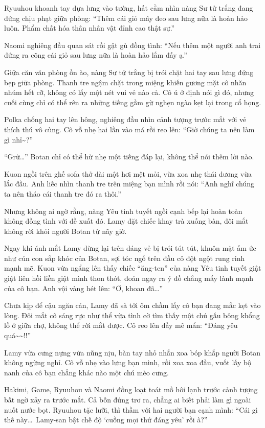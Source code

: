 \documentclass[../main.tex]{subfiles}
\begin{document}
Ryuuhou khoanh tay dựa lưng vào tường, hất cằm nhìn nàng Sư tử trắng đang đứng chịu phạt giữa phòng: ``Thêm cái giỏ mây đeo sau lưng nữa là hoàn hảo luôn. Phẩm chất hóa thân nhân vật đỉnh cao thật sự.''

Naomi nghiêng đầu quan sát rồi gật gù đồng tình: ``Nếu thêm một người anh trai đứng ra cõng cái giỏ sau lưng nữa là hoàn hảo lắm đấy ạ.''

Giữa căn văn phòng ồn ào, nàng Sư tử trắng bị trói chặt hai tay sau lưng đứng bẹp giữa phòng. Thanh tre ngậm chặt trong miệng khiến gương mặt cô nhăn nhúm hết cỡ, không có lấy một nét vui vẻ nào cả. Cô ú ớ định nói gì đó, nhưng cuối cùng chỉ có thể rên ra những tiếng gầm gừ nghẹn ngào kẹt lại trong cổ họng.

Polka chống hai tay lên hông, nghiêng đầu nhìn cảnh tượng trước mắt với vẻ thích thú vô cùng. Cô vỗ nhẹ hai lần vào má rồi reo lên: ``Giờ chúng ta nên làm gì nhỉ\~{}?''

``Grừ\dots'' Botan chỉ có thể hừ nhẹ một tiếng đáp lại, không thể nói thêm lời nào.

Kuon ngồi trên ghế sofa thở dài một hơi mệt mỏi, vừa xoa nhẹ thái dương vừa lắc đầu. Anh liếc nhìn thanh tre trên miệng bạn mình rồi nói: ``Anh nghĩ chúng ta nên tháo cái thanh tre đó ra thôi.''

Nhưng không ai ngờ rằng, nàng Yêu tinh tuyết ngồi cạnh bếp lại hoàn toàn không đồng tình với đề xuất đó. Lamy đặt chiếc khay trà xuống bàn, đôi mắt không rời khỏi người Botan từ nãy giờ.

Ngay khi ánh mắt Lamy dừng lại trên dáng vẻ bị trói tút tút, khuôn mặt ấm ức như cún con sắp khóc của Botan, sợi tóc ngố trên đầu cô đột ngột rung rinh mạnh mẽ. Kuon vừa ngẩng lên thấy chiếc ``ăng-ten'' của nàng Yêu tinh tuyết giật giật liên hồi liền giật mình thon thót, đoán ngay ra ý đồ chẳng mấy lành mạnh của cô bạn. Anh vội vàng hét lên: ``Ơ, khoan đã\dots''

Chưa kịp để cậu ngăn cản, Lamy đã sà tới ôm chầm lấy cô bạn đang mắc kẹt vào lòng. Đôi mắt cô sáng rực như thể vừa tình cờ tìm thấy một chú gấu bông khổng lồ ở giữa chợ, không thể rời mắt được. Cô reo lên đầy mê mẩn: ``Đáng yêu quá\~{}\~{}!!''


Lamy vừa cưng nựng vừa nũng nịu, bàn tay nhỏ nhắn xoa bóp khắp người Botan không ngừng nghỉ. Cô vỗ nhẹ vào lưng bạn mình, rồi xoa xoa đầu, vuốt lấy bộ nanh của cô bạn chẳng khác nào một chú mèo cưng.

Hakimi, Game, Ryuuhou và Naomi đồng loạt toát mồ hôi lạnh trước cảnh tượng bất ngờ xảy ra trước mắt. Cả bốn đứng trơ ra, chẳng ai biết phải làm gì ngoài nuốt nước bọt. Ryuuhou tặc lưỡi, thì thầm với hai người bạn cạnh mình: ``Cái gì thế này\dots\ Lamy-san bật chế độ `cuồng mọi thứ đáng yêu' rồi à?''
\end{document}
